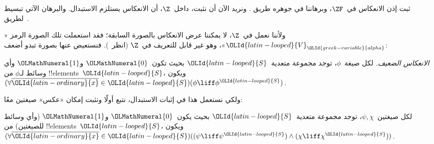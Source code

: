 \documentclass[../../../include/open-logic-section]{subfiles}
\begin{document}
ثبت إذن الانعكاس في~$\ZF$، وبرهاننا في جوهره طريق
\citet{Montague1961}. ونريد الآن أن نثبت، داخل~$\Z$، أن الانعكاس
يستلزم الاستبدال. والبرهان الآتي تبسيط لطريق~\citet{Levy1960}.

ولأننا نعمل في~$\Z$، لا يمكننا عرض الانعكاس بالصورة السابقة؛ فقد
استعملت تلك الصورة الرمز «$\OLId{latin-looped}{V}_\OLId{greek-variable}{alpha}$»، وهو غير قابل للتعريف في~$\Z$
(انظر~). فنستعيض عنها بصورة تبدو أضعف:

\begin{defish}
\emph{الانعكاس الضعيف.} لكل صيغة~$\phi$، توجد مجموعة متعدية~$\OLId{latin-looped}{S}$ بحيث
تكون~$\OLMathNumeral{0}$ و$\OLMathNumeral{1}$ وأي وسائط لـ$\phi$ من !!{element}s~$\OLId{latin-looped}{S}$، ويكون
$(\forall \overline{\OLId{latin-ordinary}{x}} \in \OLId{latin-looped}{S})(\phi \liff \phi^\OLId{latin-looped}{S})$.
\end{defish}

ولكي نستعمل هذا في إثبات الاستبدال، نتبع أولًا
\citet[first part of Theorem 2]{Levy1960} ونثبت إمكان «عكس» صيغتين
معًا:

\begin{lem}
لكل صيغتين~$\psi, \chi$، توجد مجموعة متعدية~$\OLId{latin-looped}{S}$ بحيث يكون~$\OLMathNumeral{0}$ و$\OLMathNumeral{1}$
(وأي وسائط للصيغتين) من !!{element}s~$\OLId{latin-looped}{S}$، ويكون
$(\forall \overline{\OLId{latin-ordinary}{x}} \in \OLId{latin-looped}{S})((\psi \liff \psi^\OLId{latin-looped}{S}) \land (\chi
\liff \chi^\OLId{latin-looped}{S}))$.
\end{lem}
\end{document}
